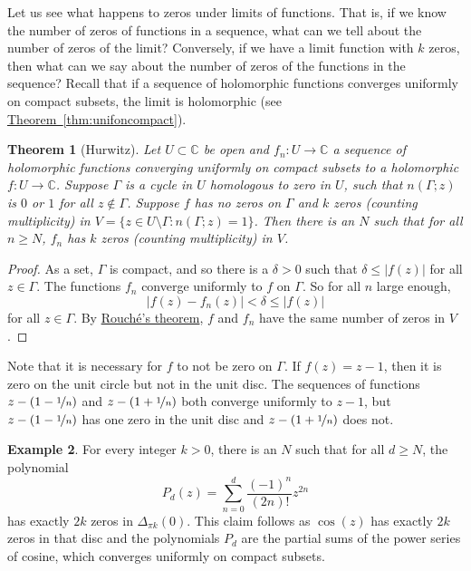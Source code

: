 \documentclass[12pt,openany]{book}
\newcommand{\sabs}[1]{\lvert {#1} \rvert}
\newcommand{\C}{{\mathbb{C}}}
\theoremstyle{plain}
\newtheorem{thm}{Theorem}[section]
\theoremstyle{remark}
\theoremstyle{definition}
\theoremstyle{exercise}
\theoremstyle{example}
\newtheorem{example}[thm]{Example}
\newcommand{\thmref}[1]{\hyperref[#1]{Theorem~\ref*{#1}}}
\begin{document}
Let us see what happens to zeros under limits of functions.
That is, if we know the number of zeros of functions in a sequence,
what can we tell about the number of zeros of the limit?  Conversely,
if we have a limit function with $k$ zeros, then what can
we say about the number of zeros of the functions in the sequence?
Recall that if a sequence of holomorphic
functions converges uniformly on compact subsets, the limit is holomorphic
(see \thmref{thm:unifoncompact}).

\begin{thm}[Hurwitz]
Let $U \subset \C$ be open and $f_n \colon U \to \C$ a sequence of
holomorphic functions converging uniformly on compact subsets
to a holomorphic $f \colon U \to \C$.  Suppose $\Gamma$ is
a cycle in $U$ homologous to zero in $U$,
such that $n(\Gamma;z)$ is $0$ or $1$ for all $z \notin \Gamma$.
Suppose $f$ has no zeros on $\Gamma$ and $k$ zeros (counting
multiplicity) in $V = \bigl\{ z \in U \setminus \Gamma : n(\Gamma;z) = 1 \bigr\}$.
Then there is an $N$ such that for all $n \geq N$,
$f_n$ has $k$ zeros (counting multiplicity) in $V$.
\end{thm}

\begin{proof}
As a set, $\Gamma$ is compact, and so
there is a $\delta > 0$ such that $\delta \leq \sabs{f(z)}$
for all $z \in \Gamma$.
The functions $f_n$
converge uniformly to $f$ on $\Gamma$.
So for all $n$ large enough,
\begin{equation*}
\sabs{f(z)-f_n(z)} < \delta \leq \sabs{f(z)}
\end{equation*}
for all $z \in \Gamma$.  By \hyperref[thm:rouche2]{Rouch\'e's theorem},
$f$ and $f_n$ have the same number of zeros in $V$.
\end{proof}

Note that it is necessary for $f$
to not be zero on $\Gamma$.  If $f(z) = z-1$, then it is zero on
the unit circle but not in the unit disc.
The sequences of functions $z-(1-\nicefrac{1}{n})$ and 
$z-(1+\nicefrac{1}{n})$ both converge uniformly to $z-1$, but
$z-(1-\nicefrac{1}{n})$ has one zero in the unit disc
and $z-(1+\nicefrac{1}{n})$ does not.

\begin{example}
For every integer $k > 0$, there is an $N$ such that
for all $d \geq N$,
the polynomial
\begin{equation*}
P_d(z) = \sum_{n=0}^d \frac{{(-1)}^n}{(2n)!}z^{2n}
\end{equation*}
has exactly $2k$ zeros in $\Delta_{\pi k}(0)$.
This claim follows as $\cos(z)$ has exactly $2k$ zeros in that disc
and the polynomials $P_d$ are the partial sums of the power series of
cosine, which converges uniformly on compact subsets.
\end{example}
  
\end{document}
